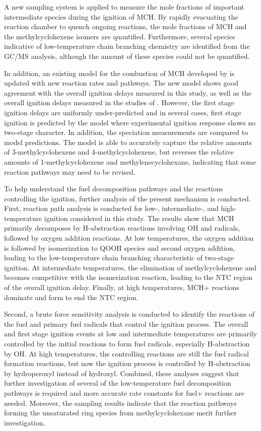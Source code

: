 \documentclass[../main.tex]{subfiles}
\begin{document}
A new sampling system is applied to measure the mole fractions of important
intermediate species during the ignition of MCH. By rapidly evacuating
the reaction chamber to quench ongoing reactions, the mole fractions of
MCH and the methylcyclohexene isomers are quantified. Furthermore, several
species indicative of low-temperature chain branching chemistry are identified
from the GC/MS analysis, although the amount of these species could not
be quantified.

In addition, an existing model for the combustion of MCH developed by
\textcite{Pitz2007} is updated with new reaction rates and pathways.
The new model shows good agreement with the overall ignition delays
measured in this study, as well as the overall ignition delays measured
in the studies of \textcite{Mittal2009,Vasu2009,Vanderover2009}. However,
the first stage ignition delays are uniformly under-predicted and in
several cases, first stage ignition is predicted by the model where
experimental ignition response shows no two-stage character. In addition,
the speciation measurements are compared to model predictions. The model
is able to accurately capture the relative amounts of 3-methylcyclohexene
and 4-methylcyclohexene, but reverses the relative amounts of 1-methylcyclohexene
and methylenecyclohexane, indicating that some reaction pathways may need to be revised.

To help
understand the fuel decomposition pathways and the reactions controlling
the ignition, further analysis of the present mechanism is conducted.
First, reaction path analysis is conducted for low-, intermediate-, and
high-temperature ignition considered in this study. The results show that
MCH primarily decomposes by H-abstraction reactions involving OH and 
radicals, followed by oxygen addition reactions. At low temperatures,
the oxygen addition is followed by isomerization to QOOH species and
second oxygen addition, leading to the low-temperature chain branching
characteristic of two-stage ignition. At intermediate temperatures, the
elimination of methylcyclohexene and  becomes competitive with the
isomerization reaction, leading to the NTC region of the overall ignition
delay. Finally, at high temperatures, MCH+ reactions dominate and form  to end
the NTC region.

Second, a brute force sensitivity analysis is conducted to identify the
reactions of the fuel and primary fuel radicals that control the ignition
process. The overall and first stage ignition events at low and intermediate
temperatures are primarily controlled by the initial reactions to form
fuel radicals, especially H-abstraction by OH. At high temperatures, the
controlling reactions are still the fuel radical formation reactions, but
now the ignition process is controlled by H-abstraction by hydroperoxyl
instead of hydroxyl. Combined, these analyses suggest that further
investigation of several of the low-temperature fuel decomposition
pathways is required and more accurate rate constants for fuel+
reactions are needed. Moreover, the sampling results indicate that the
reaction pathways forming the unsaturated ring species from methylcyclohexane
merit further investigation.
\end{document}
